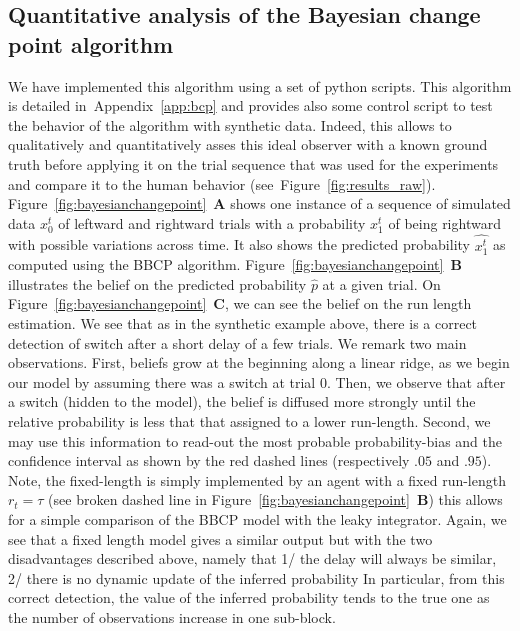 \documentclass[12pt,english]{article}%
\newcommand{\seeFig}[1]{Figure~\ref{fig:#1}}
\newcommand{\seeApp}[1]{Appendix~\ref{app:#1}}
\begin{document}
\subsection{Quantitative analysis of the Bayesian change point algorithm}
We have implemented this algorithm using a set of python scripts.
This algorithm is detailed in~\seeApp{bcp} and provides also some control script
to test the behavior of the algorithm with synthetic data.
Indeed, this allows to qualitatively and quantitatively asses
this ideal observer with a known ground truth before applying it
on the trial sequence that was used for the experiments and compare it to the human behavior (see~\seeFig{results_raw}).
\seeFig{bayesianchangepoint}~\textbf{A} shows
one instance of a sequence of simulated data $x_0^t$
of leftward and rightward trials with a probability $x_1^t$
of being rightward with possible variations across time.
It also shows the predicted probability $\hat{x_1^t}$
as computed using the BBCP algorithm.
\seeFig{bayesianchangepoint}~\textbf{B} illustrates
the belief on the predicted probability $\hat{p}$ at a given trial.
On \seeFig{bayesianchangepoint}~\textbf{C},
we can see the belief on the run length estimation.
We see that as in the synthetic example above,
there is a correct detection of switch after a short delay of a few trials.
We remark two main observations.
First, beliefs grow at the beginning along a linear ridge,
as we begin our model by assuming there was a switch at trial $0$.
Then, we observe that after a switch (hidden to the model),
the belief is diffused more strongly until the relative probability
is less that that assigned to a lower run-length.
Second, we may use this information to read-out the most probable probability-bias and the confidence interval
as shown by the red dashed lines (respectively $.05$ and $.95$).
Note, the fixed-length is simply implemented
by an agent with a fixed run-length $r_t=\tau$ (see broken dashed line in \seeFig{bayesianchangepoint}~\textbf{B})
this allows for a simple comparison of the BBCP model with the leaky integrator.
Again, we see that a fixed length model gives a similar output
but with the two disadvantages described above,  namely that
1/ the delay will always be similar,
2/ there is no dynamic update of the inferred probability
In particular, from this correct detection,
the value of the inferred probability tends to the true one as the number of observations increase in one sub-block.
\end{document}
